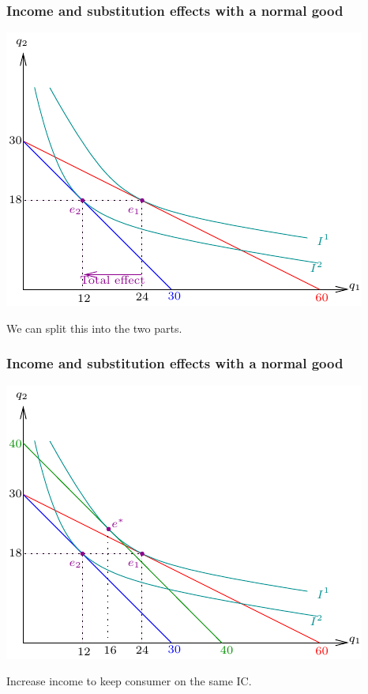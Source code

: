 \documentclass[xcolor=pdftex,dvipsnames]{beamer}
\begin{document}
\begin{frame}
\frametitle{Income and substitution effects with a normal good}
\begin{center}\includegraphics{pics/NormalIncSubEffect1}
\end{center}

We can split this into the two parts.
\end{frame}

\begin{frame}
\frametitle{Income and substitution effects with a normal good}
\begin{center}\includegraphics{pics/NormalIncSubEffect2}
\end{center}

Increase income to keep consumer on the same IC.
\end{frame}
\end{document}

